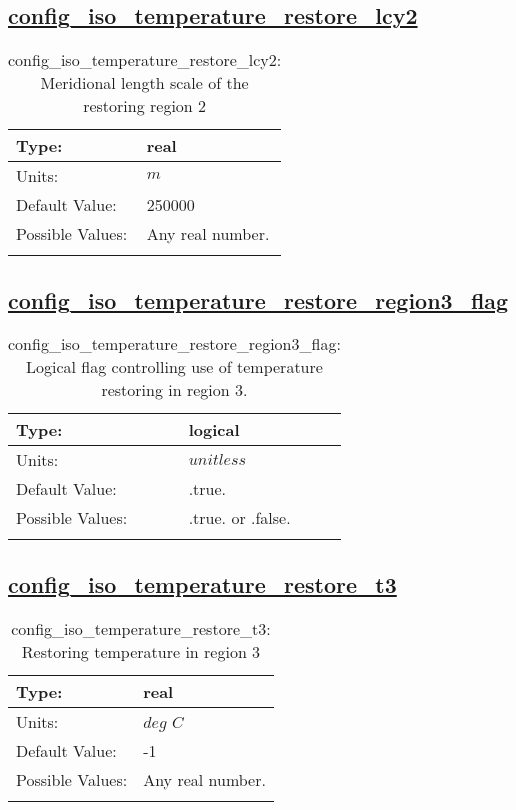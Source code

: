 \subsection[config\_iso\_temperature\_restore\_lcy2]{\hyperref[sec:nm_tab_iso]{config\_iso\_temperature\_restore\_lcy2}}
\label{subsec:nm_sec_config_iso_temperature_restore_lcy2}
\begin{center}
\begin{longtable}{| p{2.0in} || p{4.0in} |}
    \hline
    Type: & real \\
    \hline
    Units: & $m$ \\
    \hline
    Default Value: & 250000 \\
    \hline
    Possible Values: & Any real number. \\
    \hline
    \caption{config\_iso\_temperature\_restore\_lcy2: Meridional length scale of the restoring region 2}
\end{longtable}
\end{center}
\subsection[config\_iso\_temperature\_restore\_region3\_flag]{\hyperref[sec:nm_tab_iso]{config\_iso\_temperature\_restore\_region3\_flag}}
\label{subsec:nm_sec_config_iso_temperature_restore_region3_flag}
\begin{center}
\begin{longtable}{| p{2.0in} || p{4.0in} |}
    \hline
    Type: & logical \\
    \hline
    Units: & $unitless$ \\
    \hline
    Default Value: & .true. \\
    \hline
    Possible Values: & .true. or .false. \\
    \hline
    \caption{config\_iso\_temperature\_restore\_region3\_flag: Logical flag controlling use of temperature restoring in region 3.}
\end{longtable}
\end{center}
\subsection[config\_iso\_temperature\_restore\_t3]{\hyperref[sec:nm_tab_iso]{config\_iso\_temperature\_restore\_t3}}
\label{subsec:nm_sec_config_iso_temperature_restore_t3}
\begin{center}
\begin{longtable}{| p{2.0in} || p{4.0in} |}
    \hline
    Type: & real \\
    \hline
    Units: & $deg$ $C$ \\
    \hline
    Default Value: & -1 \\
    \hline
    Possible Values: & Any real number. \\
    \hline
    \caption{config\_iso\_temperature\_restore\_t3: Restoring temperature in region 3}
\end{longtable}
\end{center}
